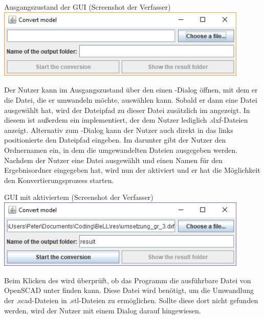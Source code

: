 \begin{Bild}{Ausgangszustand der GUI (Screenshot der Verfasser)}
	\includegraphics[width = 120mm]{Bilder/GUI/GUI_Startup}
\end{Bild}

Der Nutzer kann im Ausgangszustand über den  einen -Dialog öffnen, mit dem er die Datei, die er umwandeln möchte, auswählen kann.
Sobald er dann eine Datei ausgewählt hat, wird der Dateipfad zu dieser Datei zusätzlich im  angezeigt.
In diesem  ist außerdem ein  implementiert, der dem Nutzer lediglich .dxf-Dateien anzeigt.
Alternativ zum -Dialog kann der Nutzer auch direkt in das links positionierte  den Dateipfad eingeben.
Im  darunter gibt der Nutzer den Ordnernamen ein, in dem die umgewandelten Dateien ausgegeben werden. \\
Nachdem der Nutzer eine Datei ausgewählt und einen Namen für den Ergebnisordner eingegeben hat, wird nun der  aktiviert und er hat die Möglichkeit den Konvertierungsprozess starten.

\begin{Bild}{GUI mit aktiviertem  (Screenshot der Verfasser)}
	\includegraphics[width = 120mm]{Bilder/GUI/GUI_Convert_Ready}
\end{Bild}

Beim Klicken des  wird überprüft, ob das Programm die ausführbare Datei von OpenSCAD unter  finden kann.
Diese Datei wird benötigt, um die Umwandlung der .scad-Dateien in .stl-Dateien zu ermöglichen.
Sollte diese dort nicht gefunden werden, wird der Nutzer mit einem Dialog darauf hingewiesen.

